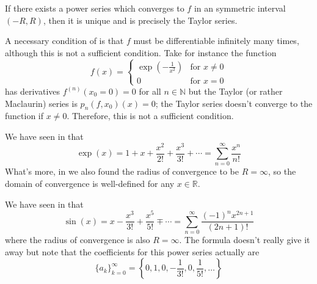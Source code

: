 \begin{thm}\label{thm-power-series-converges-to-taylor}
	If there exists a power series which converges to $f$ in an symmetric interval $(-R,R)$,
	then it is unique and is precisely the Taylor series.
\end{thm}

\begin{rem}\label{rem-power-series-converges-to-taylor}
	A necessary condition of 
	is that $f$ must be differentiable infinitely many times, although this is not
	a sufficient condition. Take for instance the function
	\begin{equation*}
		f(x)=\begin{cases}
			\exp\left(-\frac{1}{x^2}\right) & \text{for }x\neq0 \\
			0                               & \text{for }x=0
		\end{cases}
	\end{equation*}
	has derivatives $f^{(n)}(x_0=0)=0$ for all $n\in\mathbb{N}$ but the Taylor
	(or rather Maclaurin) series is $p_n(f,x_0)(x)=0$; the Taylor series doesn't
	converge to the function if $x\neq0$. Therefore, this is not a sufficient condition.
\end{rem}

\begin{exm}\label{exm-power-series-converges-to-taylor:1}
	We have seen in  that
	\begin{equation*}
		\exp(x) = 1 + x + \frac{x^2}{2!} + \frac{x^3}{3!} + \cdots = \sum_{n=0}^\infty \frac{x^n}{n!}
	\end{equation*}
	What's more, in  we also found
	the radius of convergence to be $R=\infty$, so the domain of convergence is
	well-defined for any $x\in\mathbb{R}$.
\end{exm}

\begin{exm}\label{exm-power-series-converges-to-taylor:2}
	We have seen in  that
	\begin{equation*}
		\sin(x) = x - \frac{x^3}{3!} + \frac{x^5}{5!} \mp \cdots = \sum_{n=0}^\infty \frac{(-1)^n x^{2n+1}}{(2n+1)!}
	\end{equation*}
	where the radius of convergence is also $R=\infty$. The formula doesn't really
	give it away but note that the coefficients for this power series actually are
	\begin{equation*}
		\{a_k\}_{k=0}^\infty=\left\{0,1,0,-\frac{1}{3!},0,\frac{1}{5!},\dots\right\}
	\end{equation*}
\end{exm}

